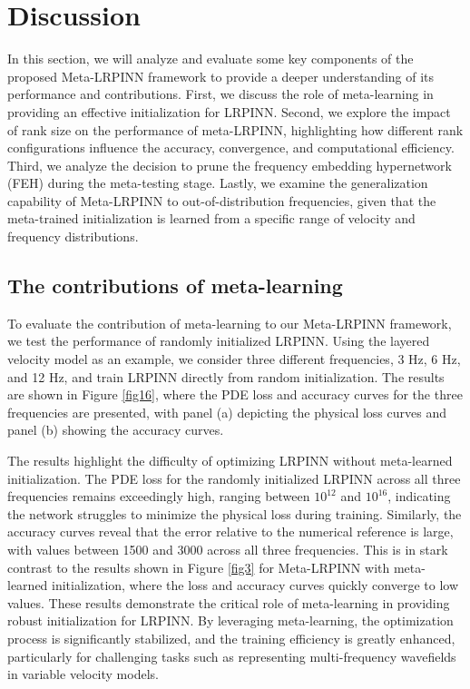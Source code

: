 \section{\textbf{Discussion}}\label{discussion}
In this section, we will analyze and evaluate some key components of the proposed Meta-LRPINN framework to provide a deeper understanding of its performance and contributions. First, we discuss the role of meta-learning in providing an effective initialization for LRPINN. Second, we explore the impact of rank size on the performance of meta-LRPINN, highlighting how different rank configurations influence the accuracy, convergence, and computational efficiency. Third, we analyze the decision to prune the frequency embedding hypernetwork (FEH) during the meta-testing stage. Lastly, we examine the generalization capability of Meta-LRPINN to out-of-distribution frequencies, given that the meta-trained initialization is learned from a specific range of velocity and frequency distributions. 

\subsection{The contributions of meta-learning}
To evaluate the contribution of meta-learning to our Meta-LRPINN framework, we test the performance of randomly initialized LRPINN. Using the layered velocity model as an example, we consider three different frequencies, 3 Hz, 6 Hz, and 12 Hz, and train LRPINN directly from random initialization. The results are shown in Figure \ref{fig16}, where the PDE loss and accuracy curves for the three frequencies are presented, with panel (a) depicting the physical loss curves and panel (b) showing the accuracy curves. 

The results highlight the difficulty of optimizing LRPINN without meta-learned initialization. The PDE loss for the randomly initialized LRPINN across all three frequencies remains exceedingly high, ranging between $10^{12}$ and $10^{16}$, indicating the network struggles to minimize the physical loss during training. Similarly, the accuracy curves reveal that the error relative to the numerical reference is large, with values between 1500 and 3000 across all three frequencies. This is in stark contrast to the results shown in Figure \ref{fig3} for Meta-LRPINN with meta-learned initialization, where the loss and accuracy curves quickly converge to low values. These results demonstrate the critical role of meta-learning in providing robust initialization for LRPINN. By leveraging meta-learning, the optimization process is significantly stabilized, and the training efficiency is greatly enhanced, particularly for challenging tasks such as representing multi-frequency wavefields in variable velocity models.

